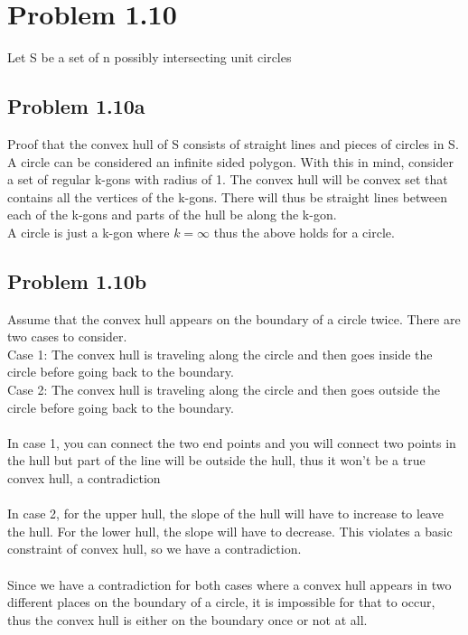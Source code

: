 \documentclass[11pt,psfig]{article}
\begin{document}
\section*{Problem 1.10}

Let S be a set of n possibly intersecting unit circles

\subsection*{Problem 1.10a}

Proof that the convex hull of S consists of straight lines and pieces of circles in S. 
\\
A circle can be considered an infinite sided polygon. With this in mind, consider a set of regular k-gons with radius of 1. The convex hull will be convex set that contains all the vertices of the k-gons. There will thus be straight lines between each of the k-gons and parts of the hull be along the k-gon. 
\\
A circle is just a k-gon where $k=\infty$ thus the above holds for a circle. 

\subsection*{Problem 1.10b}

Assume that the convex hull appears on the boundary of a circle twice. There are two cases to consider.\\
Case 1: The convex hull is traveling along the circle and then goes inside the circle before going back to the boundary. \\
Case 2: The convex hull is traveling along the circle and then goes outside the circle before going back to the boundary.\\
\\
In case 1, you can connect the two end points and you will connect two points in the hull but part of the line will be outside the hull, thus it won't be a true convex hull, a contradiction\\
\\
In case 2, for the upper hull, the slope of the hull will have to increase to leave the hull. For the lower hull, the slope will have to decrease. This violates a basic constraint of convex hull, so we have a contradiction. \\
\\
Since we have a contradiction for both cases where a convex hull appears in two different places on the boundary of a circle, it is impossible for that to occur, thus the convex hull is either on the boundary once or not at all. 
\end{document}
